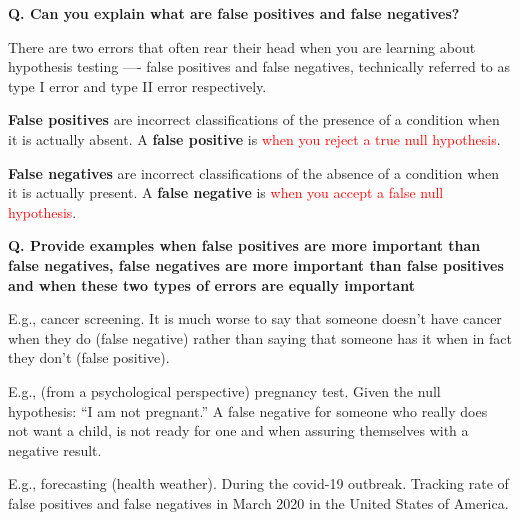 \begin{frame}[fragile]{\textbf{Q. Can you explain what are false positives and
      false negatives?}}
  \begin{wideitemize}
  \item There are two errors that often rear their head when you are learning
    about hypothesis testing —- false positives and false negatives, technically
    referred to as type I error and type II error respectively.
  \item \textbf{False positives} are incorrect classifications of the presence
    of a condition when it is actually absent. A \textbf{false positive} is \textcolor{red}{when you
      reject a true null hypothesis}.
  \item \textbf{False negatives} are incorrect classifications of the absence of
    a condition when it is actually present. A \textbf{false negative} is \textcolor{red}{when you accept
      a false null hypothesis}.
  \end{wideitemize}
\end{frame}

\begin{frame}[fragile]{\textbf{Q. Provide examples when false positives are more
      important than false negatives, false negatives are more important than
      false positives and when these two types of errors are equally important}}
  \begin{wideitemize}
  \item E.g., cancer screening. It is much worse to say that someone
    doesn't have cancer when they do (false negative) rather than saying that
    someone has it when in fact they don't (false positive).
  \item E.g., (from a psychological perspective) pregnancy test. Given the null
    hypothesis: ``I am not pregnant.'' A false negative for someone who really
    does not want a child, is not ready for one and when assuring themselves
    with a negative result.
  \item E.g., forecasting (health weather). During the covid-19 outbreak.
    Tracking rate of false positives and false negatives in March 2020 in the
    United States of America. 
  \end{wideitemize}
\end{frame}


